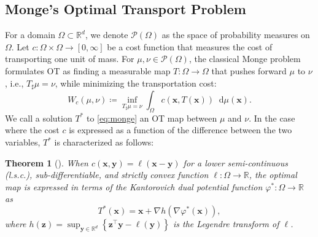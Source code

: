 \documentclass{article} %
\theoremstyle{plain}
\newtheorem{theorem}{Theorem}[section]
\theoremstyle{definition}
\theoremstyle{remark}
\newcommand{\bR}{\mathbb{R}}
\newcommand{\bx}{\mathbf{x}}
\newcommand{\by}{\mathbf{y}}
\newcommand{\bz}{\mathbf{z}}
\newcommand*\diff{\mathop{}\!\mathrm{d}}
\newcommand{\tp}{^{\top}}
\begin{document}
\subsection{Monge’s Optimal Transport Problem}\vspace{-0.3em}
For a domain $\Omega\subset\bR^d$, we denote $\mathscr{P}(\Omega)$ as the space of probability measures on $\Omega$.
Let $c:\Omega\times\Omega\rightarrow [0,\infty]$ be a cost function that measures the cost of transporting one unit of mass. For $\mu,\nu\in\mathscr{P}\left(\Omega\right)$, the classical Monge problem formulates OT as finding a measurable map $T:\Omega\rightarrow\Omega$ that pushes forward $\mu$ to $\nu$, i.e., $T_\sharp\mu=\nu$, while minimizing the transportation cost:
\begin{equation}\label{eq:monge}
    W_c\left(\mu,\nu\right)\coloneqq \underset{T_\sharp\mu=\nu}{\inf} \int_\Omega c\left(\bx,T\left(\bx\right)\right)\diff\mu\left(\bx\right).
\end{equation}
We call a solution $T^*$ to \eqref{eq:monge} an OT map between $\mu$ and $\nu$.
In the case where the cost $c$ is expressed as a function of the difference between the two variables, $T^*$ is characterized as follows:
\begin{theorem}[\cite{santambrogio2015optimal}]\label{thm:ot_sol}
When $c\left(\bx,\by\right)=\ell\left(\bx-\by\right)$ for a lower semi-continuous (l.s.c.), sub-differentiable, and strictly convex function $\ell:\Omega\rightarrow\bR$, the optimal map is expressed in terms of the Kantorovich dual potential function $\varphi^*:\Omega\rightarrow\bR$ as
\begin{equation}\label{eq:primal_dual_relation}
    T^*\left(\bx\right) = \bx + \nabla h\left(\nabla\varphi^*\left(\bx\right)\right),
\end{equation}
where $h\left(\bz\right)=\sup_{\by\in\bR^d}\left\{\bz\tp\by-\ell\left(\by\right)\right\}$ is the Legendre transform of $\ell$.
\end{theorem}
\end{document}
